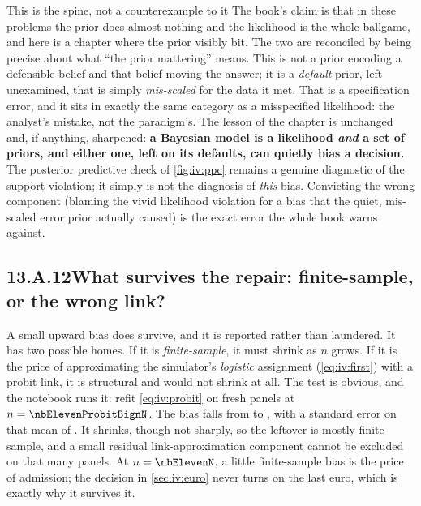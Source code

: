 \begin{intuition}{This is the spine, not a counterexample to it}
The book's claim is that in these problems the prior does almost nothing and the likelihood is the
whole ballgame, and here is a chapter where the prior visibly bit. The two are reconciled by being
precise about what ``the prior mattering'' means. This is not a prior encoding a defensible belief and
that belief moving the answer; it is a \emph{default} prior, left unexamined, that is simply
\emph{mis-scaled} for the data it met. That is a specification error, and it sits in exactly the same
category as a misspecified likelihood: the analyst's mistake, not the paradigm's. The lesson of the
chapter is unchanged and, if anything, sharpened: \textbf{a Bayesian model is a likelihood
\emph{and} a set of priors, and either one, left on its defaults, can quietly bias a decision.} The
posterior predictive check of \cref{fig:iv:ppc} remains a genuine diagnostic of the support violation;
it simply is not the diagnosis of \emph{this} bias. Convicting the wrong component (blaming the
vivid likelihood violation for a bias that the quiet, mis-scaled error prior actually caused) is
the exact error the whole book warns against.
\end{intuition}

\subsection*{13.A.12\quad What survives the repair: finite-sample, or the wrong link?}

A small upward bias does survive, and it is reported rather than laundered. It has two possible
homes. If it is \emph{finite-sample}, it must shrink as $n$ grows. If it is the price of
approximating the simulator's \emph{logistic} assignment (\cref{eq:iv:first}) with a probit link, it
is structural and would not shrink at all. The test is obvious, and the notebook runs it: refit
\cref{eq:iv:probit} on \nbElevenProbitBignSeeds{} fresh panels at $n = \nbElevenProbitBignN$. The
bias falls from \eur{\nbElevenSeedBias} to \eur{\nbElevenProbitBiasBign}, with a standard error on
that mean of \eur{\nbElevenProbitBiasBignSe}. It shrinks, though not sharply, so the leftover is
mostly finite-sample, and a small residual link-approximation component cannot be excluded on that
many panels. At $n = \nbElevenN$, a little finite-sample bias is the price of admission; the decision
in \cref{sec:iv:euro} never turns on the last euro, which is exactly why it survives it.

